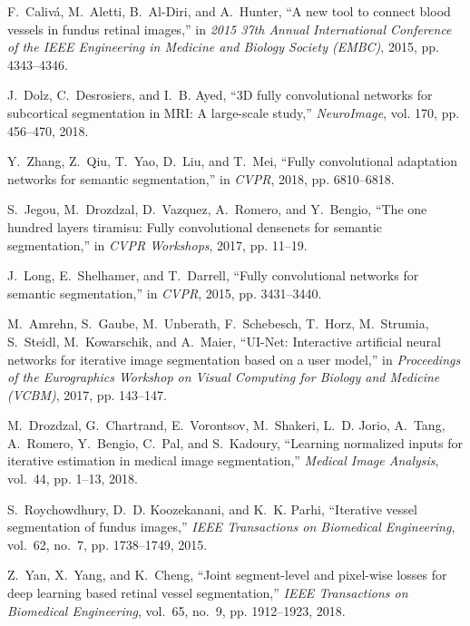 \documentclass[10pt,twocolumn,letterpaper]{article}
\begin{document}
{\begin{thebibliography}{10}
	F.~{Calivá}, M.~{Aletti}, B.~{Al-Diri}, and A.~{Hunter}, ``A new tool to
	connect blood vessels in fundus retinal images,'' in \emph{2015 37th Annual
		International Conference of the IEEE Engineering in Medicine and Biology
		Society (EMBC)}, 2015, pp. 4343--4346.
	
	J.~Dolz, C.~Desrosiers, and I.~B. Ayed, ``{3D} fully convolutional networks for
	subcortical segmentation in {MRI}: A large-scale study,'' \emph{NeuroImage},
	vol. 170, pp. 456--470, 2018.
	
	Y.~Zhang, Z.~Qiu, T.~Yao, D.~Liu, and T.~Mei, ``Fully convolutional adaptation
	networks for semantic segmentation,'' in \emph{CVPR}, 2018, pp. 6810--6818.
	
	S.~Jegou, M.~Drozdzal, D.~Vazquez, A.~Romero, and Y.~Bengio, ``The one hundred
	layers tiramisu: Fully convolutional densenets for semantic segmentation,''
	in \emph{CVPR Workshops}, 2017, pp. 11--19.
	
	J.~Long, E.~Shelhamer, and T.~Darrell, ``Fully convolutional networks for
	semantic segmentation,'' in \emph{CVPR}, 2015, pp. 3431--3440.
	
	M.~Amrehn, S.~Gaube, M.~Unberath, F.~Schebesch, T.~Horz, M.~Strumia, S.~Steidl,
	M.~Kowarschik, and A.~Maier, ``{UI-Net}: Interactive artificial neural
	networks for iterative image segmentation based on a user model,'' in
	\emph{Proceedings of the Eurographics Workshop on Visual Computing for
		Biology and Medicine (VCBM)}, 2017, pp. 143--147.
	
	M.~Drozdzal, G.~Chartrand, E.~Vorontsov, M.~Shakeri, L.~D. Jorio, A.~Tang,
	A.~Romero, Y.~Bengio, C.~Pal, and S.~Kadoury, ``Learning normalized inputs
	for iterative estimation in medical image segmentation,'' \emph{Medical Image
		Analysis}, vol.~44, pp. 1--13, 2018.
	
	S.~{Roychowdhury}, D.~D. {Koozekanani}, and K.~K. {Parhi}, ``Iterative vessel
	segmentation of fundus images,'' \emph{IEEE Transactions on Biomedical
		Engineering}, vol.~62, no.~7, pp. 1738--1749, 2015.
	
	Z.~{Yan}, X.~{Yang}, and K.~{Cheng}, ``Joint segment-level and pixel-wise
	losses for deep learning based retinal vessel segmentation,'' \emph{IEEE
		Transactions on Biomedical Engineering}, vol.~65, no.~9, pp. 1912--1923,
	2018.
	

\end{thebibliography}}
\end{document}
